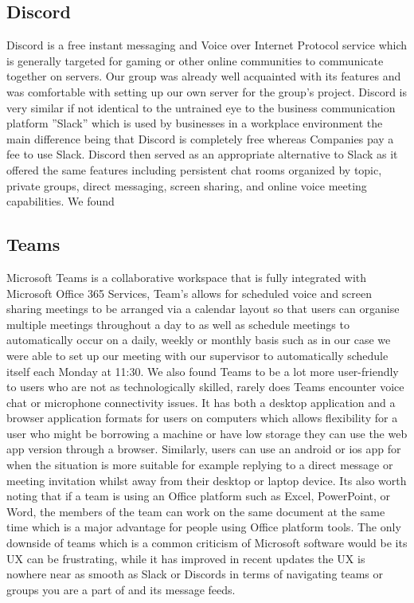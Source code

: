 \subsection{Discord}
Discord is a free instant messaging and Voice over Internet Protocol service which is generally targeted for gaming or other online communities to communicate together on servers. Our group was already well acquainted with its features and was comfortable with setting up our own server for the group's project. Discord is very similar if not identical to the untrained eye to the business communication platform ”Slack” which is used by businesses in a workplace environment the main difference being that Discord is completely free whereas Companies pay a fee to use Slack. Discord then served as an appropriate alternative to Slack as it offered the same features including persistent chat rooms organized by topic, private groups, direct messaging, screen sharing, and online voice meeting capabilities.
\newline
\newline
We found
\subsection{Teams}
Microsoft Teams is a collaborative workspace that is fully integrated with Microsoft Office 365 Services, Team’s allows for scheduled voice and screen sharing meetings to be arranged via a calendar layout so that users can organise multiple meetings throughout a day to as well as schedule meetings to automatically occur on a daily, weekly or monthly basis such as in our case we were able to set up our meeting with our supervisor to automatically schedule itself each Monday at 11:30.
\newline
\newline
We also found Teams to be a lot more user-friendly to users who are not as technologically skilled, rarely does Teams encounter voice chat or microphone connectivity issues. It has both a desktop application and a browser application formats for users on computers which allows flexibility for a user who might be borrowing a machine or have low storage they can use the web app version through a browser.
\newline
\newline
Similarly, users can use an android or ios app for when the situation is more suitable for example replying to a direct message or meeting invitation whilst away from their desktop or laptop device. Its also worth noting that if a team is using an Office platform such as Excel, PowerPoint, or Word, the members of the team can work on the same document at the same time which is a major advantage for people using Office platform tools. The only downside of teams which is a common criticism of Microsoft software would be its UX can be frustrating, while it has improved in recent updates the UX is nowhere near as smooth as Slack or Discords in terms of navigating teams or groups you are a part of and its message feeds.

